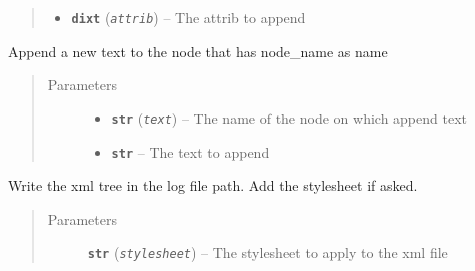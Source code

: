 \documentclass[a4paper,10pt,english]{sphinxmanual}
\begin{document}
\begin{fulllineitems}
\begin{fulllineitems}
\begin{quote}
\begin{description}
\begin{itemize}
\item {} 
\textbf{\texttt{dixt}} (\emph{\texttt{attrib}}) -- The attrib to append

\end{itemize}

\end{description}\end{quote}

\end{fulllineitems}


\begin{fulllineitems}
\label{commands/apidoc/src:src.xmlManager.XmlLogFile.append_node_text}
Append a new text to the node that has node\_name as name
\begin{quote}\begin{description}
\item[{Parameters}] \leavevmode\begin{itemize}
\item {} 
\textbf{\texttt{str}} (\emph{\texttt{text}}) -- The name of the node on which append text

\item {} 
\textbf{\texttt{str}} -- The text to append

\end{itemize}

\end{description}\end{quote}

\end{fulllineitems}


\begin{fulllineitems}
\label{commands/apidoc/src:src.xmlManager.XmlLogFile.write_tree}
Write the xml tree in the log file path. Add the stylesheet if asked.
\begin{quote}\begin{description}
\item[{Parameters}] \leavevmode
\textbf{\texttt{str}} (\emph{\texttt{stylesheet}}) -- The stylesheet to apply to the xml file

\end{description}\end{quote}

\end{fulllineitems}


\end{fulllineitems}
\end{document}

